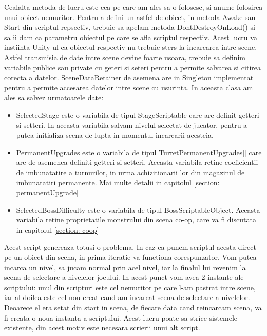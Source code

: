 \documentclass[12pt, a4paper]{article}
\begin{document}
	Cealalta metoda de lucru este cea pe care am ales sa o folosesc, si anume folosirea unui obiect nemuritor. Pentru a defini un astfel de obiect, in metoda Awake sau Start din scriptul repsectiv, trebuie sa apelam metoda DontDestroyOnLoad() si sa ii dam ca parametru obiectul pe care se afla scriptul respectiv. Acest lucru va instiinta Unity-ul ca obiectul respectiv nu trebuie sters la incarcarea intre scene. Astfel transmisia de date intre scene devine foarte usoara, trebuie sa definim variabile publice sau private cu geteri si seteri pentru a permite salvarea si citirea corecta a datelor. SceneDataRetainer de asemena are in Singleton implementat pentru a permite accesarea datelor intre scene cu usurinta. In aceasta clasa am ales sa salvez urmatoarele date:
	
	\begin{itemize}
		\item SelectedStage este o variabila de tipul StageScriptable care are definit getteri si setteri. In aceasta variabila salvam nivelul selectat de jucator, pentru a putea initializa scena de lupta in momentul incarcarii acesteia.
		\item PermanentUpgrades este o variabila de tipul TurretPermanentUpgrades[] care are de asemenea definiti getteri si setteri. Aceasta variabila retine coeficientii de imbunatatire a turnurilor, in urma achizitionarii lor din magazinul de imbunatatiri permanente. Mai multe detalii in capitolul \ref{section: permanentUpgrade}
		\item SelectedBossDifficulty este o variabila de tipul BossScriptableObject. Aceasta variabila retine proprietatile monstrului din scena co-op, care va fi discutata in capitolul \ref{section: coop}
	\end{itemize}

	Acest script genereaza totusi o problema. In caz ca punem scriptul acesta direct pe un obiect din scena, in prima iteratie va functiona corespunzator. Vom putea incarca un nivel, sa jucam normal prin acel nivel, iar la finalul lui revenim la scena de selectare a nivelelor jocului. In acest punct vom avea 2 instante ale scriptului: unul din scripturi este cel nemuritor pe care l-am pastrat intre scene, iar al doilea este cel nou creat cand am incarcat scena de selectare a nivelelor. Deoarece el era setat din start in scena, de fiecare data cand reincarcam scena, va fi creata o noua instanta a scriptului. Acest lucru poate sa strice sistemele existente, din acest motiv este necesara scrierii unui alt script.
	\newline
	
\end{document}
